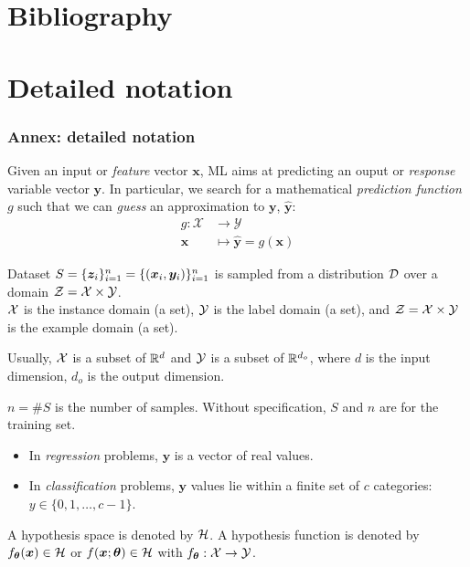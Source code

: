 \documentclass{beamer}
\begin{document}
\section{Bibliography}



\section{Detailed notation}

\begin{frame}[allowframebreaks]
  \frametitle{Annex: detailed notation}

  Given an input or {\em feature} vector $\bm{x}$, ML aims at predicting an ouput or {\em response} variable vector $\bm{y}$. In particular, we search for a mathematical {\em prediction function} $g$ such that we can {\em guess} an approximation to $\bm{y}$, $\hat{\bm{y}}$:
  \begin{align*}
      g \colon \mathcal{X}  & \rightarrow \mathcal{Y}\\
      \bm{x}                &\mapsto \hat{\bm{y}}=g(\bm{x})
  \end{align*}

  \begin{definition}
    Dataset  $S=\{\bm{z}_i\}_{i=1}^n=\{(\bm{x}_i,\bm{y}_i)\}_{i=1}^n$ is sampled from a distribution $\mathcal{D}$ over a domain $\mathcal{Z}=\mathcal{X}\times\mathcal{Y}$.\\
    $\mathcal{X}$  is the instance domain (a set), $\mathcal{Y}$ is the label domain (a set), and $\mathcal{Z}=\mathcal{X}\times\mathcal{Y}$ is the example domain (a set).
  \end{definition}
  
  Usually,
  $\mathcal{X}$ is a subset of $\mathbb{R}^d$ and $\mathcal{Y}$ is a subset of $\mathbb{R}^{d_{o}}$, where $d$ is the input dimension, $d_{o}$ is the output dimension.
  
  $n=\#S$ is the number of samples. Without specification, $S$ and $n$ are for the training set.

  \begin{itemize}
    \item In {\em regression} problems, $\bm{y}$ is a vector of real values.
    \item In {\em classification} problems, $\bm{y}$ values lie within a finite set of $c$ categories: $y\in\{0, 1, \ldots, c-1\}$.
  \end{itemize}

  \begin{definition}  
  A hypothesis space is denoted by $\mathcal{H}$. A hypothesis function is denoted by $f_{\bm{\theta}}(\bm{x})\in\mathcal{H}$ or $f(\bm{x};\bm{\theta})\in\mathcal{H}$ with $f_{\bm{\theta}}:\mathcal{X}\to\mathcal{Y}$.
  \end{definition}
  

\end{frame}
\end{document}
